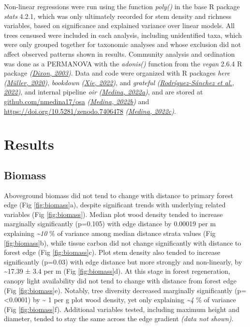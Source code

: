 \documentclass[
  12pt,
]{article}
\begin{document}
Non-linear regressions were run using the function \emph{poly()} in the base R package \emph{stats} 4.2.1,
which was only ultimately recorded for stem density and richness variables, based on significance and explained variance over linear models.
All trees censused were included in each analysis, including unidentified taxa, which were only grouped together for taxonomic analyses and whose exclusion did not affect observed patterns shown in results.
Community analysis and ordination was done as a PERMANOVA with the \emph{adonis()} function from the \emph{vegan} 2.6.4 R package \emph{(\protect\hyperlink{ref-dixon03}{Dixon, 2003})}.
Data and code were organized with R packages \emph{here} \emph{(\protect\hyperlink{ref-here}{Müller, 2020})}, \emph{bookdown} \emph{(\protect\hyperlink{ref-bookdown2022}{Xie, 2022})}, and \emph{grateful} \emph{(\protect\hyperlink{ref-grateful}{Rodríguez-Sánchez et al., 2022})}, and internal pipeline \emph{oir} \emph{(\protect\hyperlink{ref-softwareMedina22oir}{Medina, 2022a})}, and are stored at \url{github.com/nmedina17/osa} \emph{(\protect\hyperlink{ref-softwareMedina22osa}{Medina, 2022b})} and \url{https://doi.org/10.5281/zenodo.7406478} \emph{(\protect\hyperlink{ref-medina22osaDataRaw}{Medina, 2022c})}.

\hypertarget{results}{%
\section{Results}\label{results}}

\hypertarget{biomass}{%
\subsection{Biomass}\label{biomass}}

Aboveground biomass did not tend to change with distance to primary forest edge
(Fig \ref{fig:biomass}a), despite significant trends with underlying related variables
(Fig \ref{fig:biomass}).
Median plot wood density tended to increase marginally significantly
(p=0.105)
with edge distance by
0.00019 per m
explaining
\emph{\textasciitilde10} \% of variance
among median distance strata values
(Fig \ref{fig:biomass}b),
while tissue carbon did not change significantly with distance to forest edge
(Fig \ref{fig:biomass}c).
Plot stem density also tended to increase significantly
(p=0.03)
with edge distance but more strongly and non-linearly, by
\textasciitilde17.39 ±
3.4 per m
(Fig \ref{fig:biomass}d).
At this stage in forest regeneration, canopy light availability did not tend to change with distance from forest edge
(Fig \ref{fig:biomass}e).
Notably, tree diversity decreased marginally significantly
(p=\textless0.0001)
by
\textasciitilde{} 1
per g plot wood density,
yet only explaining
\emph{\textasciitilde4} \% of variance
(Fig \ref{fig:biomass}f).
Additional variables tested, including maximum height and diameter, tended to stay the same across the edge gradient \emph{(data not shown)}.
\end{document}
